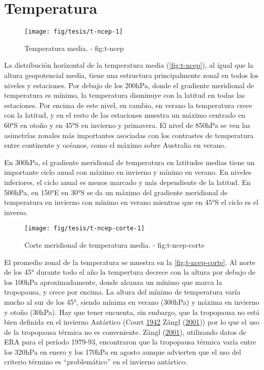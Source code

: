 \documentclass[spanish,a4paper]{book}
\begin{document}
\section{Temperatura}\label{temperatura}

\begin{landscape}\begin{figure}

{\centering \texttt{[image: fig/tesis/t-ncep-1]} 

}

\caption{Temperatura media. - fig:t-ncep}\label{fig:t-ncep}
\end{figure}
\end{landscape}

La distribución horizontal de la temperatura media
(\autoref{fig:t-ncep}), al igual que la altura geopotencial media, tiene
una estructura principalmente zonal en todos los niveles y estaciones.
Por debajo de los 200hPa, donde el gradiente meridional de temperatura
es mínimo, la temperatura disminuye con la latitud en todas las
estaciones. Por encima de este nivel, en cambio, en verano la
temperatura crece con la latitud, y en el resto de las estaciones
muestra un máximo centrado en 60°S en otoño y en 45°S en invierno y
primavera. El nivel de 850hPa se ven las asimetrías zonales más
importantes asociadas con los contrastes de temperatura entre continente
y océanos, como el máximo sobre Australia en verano.

En 300hPa, el gradiente meridional de temperatura en latitudes medias
tiene un importante ciclo anual con máximo en invierno y mínimo en
verano. En niveles inferiores, el ciclo anual es menos marcado y más
dependiente de la latitud. En 500hPa, en 150°E en 30°S se da un máximo
del gradiente meridional de temperatura en invierno con mínimo en verano
mientras que en 45°S el ciclo es el inverso.

\begin{figure}

{\centering \texttt{[image: fig/tesis/t-ncep-corte-1]} 

}

\caption{Corte meridional de temperatura media. - fig:t-ncep-corte}\label{fig:t-ncep-corte}
\end{figure}

El promedio zonal de la temperatura se muestra en la
\autoref{fig:t-ncep-corte}. Al norte de los 45° durante todo el año la
tempertura decrece con la altura por debajo de los 100hPa
aproximadamente, donde alcanza un mínimo que marca la tropopausa, y
crece por encima. La altura del mínimo de temperatura varía mucho al sur
de los 45°, siendo mínima en verano (300hPa) y máxima en invierno y
otoño (30hPa). Hay que tener encuenta, sin embargo, que la tropopausa no
está bien definida en el invierno Antártico (Court
\protect\hyperlink{ref-Court1942}{1942} Zängl
(\protect\hyperlink{ref-Zangl2001}{2001})) por lo que el uso de la
tropopausa térmica no es conveniente. Zängl
(\protect\hyperlink{ref-Zangl2001}{2001}), utilizando datos de ERA para
el período 1979-93, encontraron que la tropopausa térmica varía entre
los 320hPa en enero y los 170hPa en agosto aunque advierten que el uso
del criterio término es ``problemático'' en el invierno antártico.
\end{document}
